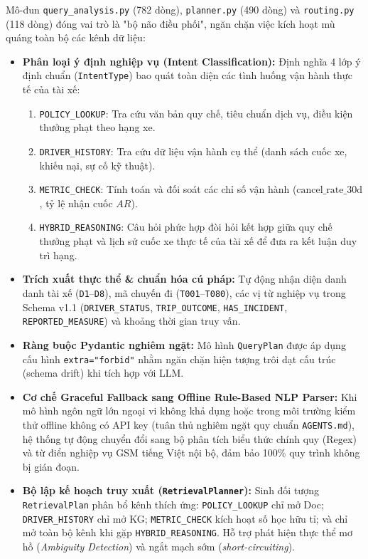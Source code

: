 \documentclass[a4paper,11pt]{article}
\begin{document}
Mô-đun \nolinkurl{query_analysis.py} (782 dòng), \nolinkurl{planner.py} (490 dòng) và \nolinkurl{routing.py} (118 dòng) đóng vai trò là "bộ não điều phối", ngăn chặn việc kích hoạt mù quáng toàn bộ các kênh dữ liệu:
\begin{itemize}[leftmargin=1.5em]
    \item \textbf{Phân loại ý định nghiệp vụ (Intent Classification):} Định nghĩa 4 lớp ý định chuẩn (\texttt{IntentType}) bao quát toàn diện các tình huống vận hành thực tế của tài xế:
    \begin{enumerate}[noitemsep]
        \item \texttt{POLICY\_LOOKUP}: Tra cứu văn bản quy chế, tiêu chuẩn dịch vụ, điều kiện thưởng phạt theo hạng xe.
        \item \texttt{DRIVER\_HISTORY}: Tra cứu dữ liệu vận hành cụ thể (danh sách cuốc xe, khiếu nại, sự cố kỹ thuật).
        \item \texttt{METRIC\_CHECK}: Tính toán và đối soát các chỉ số vận hành ($\text{cancel\_rate\_30d}$, tỷ lệ nhận cuốc $AR$).
        \item \texttt{HYBRID\_REASONING}: Câu hỏi phức hợp đòi hỏi kết hợp giữa quy chế thưởng phạt và lịch sử cuốc xe thực tế của tài xế để đưa ra kết luận duy trì hạng.
    \end{enumerate}
    \item \textbf{Trích xuất thực thể \& chuẩn hóa cú pháp:} Tự động nhận diện danh danh tài xế (\texttt{D1}--\texttt{D8}), mã chuyến đi (\texttt{T001}--\texttt{T080}), các vị từ nghiệp vụ trong Schema v1.1 (\texttt{DRIVER\_STATUS}, \texttt{TRIP\_OUTCOME}, \texttt{HAS\_INCIDENT}, \texttt{REPORTED\_MEASURE}) và khoảng thời gian truy vấn.
    \item \textbf{Ràng buộc Pydantic nghiêm ngặt:} Mô hình \texttt{QueryPlan} được áp dụng cấu hình \nolinkurl{extra="forbid"} nhằm ngăn chặn hiện tượng trôi dạt cấu trúc (schema drift) khi tích hợp với LLM.
    \item \textbf{Cơ chế Graceful Fallback sang Offline Rule-Based NLP Parser:} Khi mô hình ngôn ngữ lớn ngoại vi không khả dụng hoặc trong môi trường kiểm thử offline không có API key (tuân thủ nghiêm ngặt quy chuẩn \texttt{AGENTS.md}), hệ thống tự động chuyển đổi sang bộ phân tích biểu thức chính quy (Regex) và từ điển nghiệp vụ GSM tiếng Việt nội bộ, đảm bảo 100\% quy trình không bị gián đoạn.
    \item \textbf{Bộ lập kế hoạch truy xuất (\texttt{RetrievalPlanner}):} Sinh đối tượng \texttt{RetrievalPlan} phân bổ kênh thích ứng: \texttt{POLICY\_LOOKUP} chỉ mở Doc; \texttt{DRIVER\_HISTORY} chỉ mở KG; \texttt{METRIC\_CHECK} kích hoạt số học hữu tỉ; và chỉ mở toàn bộ kênh khi gặp \texttt{HYBRID\_REASONING}. Hỗ trợ phát hiện thực thể mơ hồ (\textit{Ambiguity Detection}) và ngắt mạch sớm (\textit{short-circuiting}).
\end{itemize}
\end{document}
